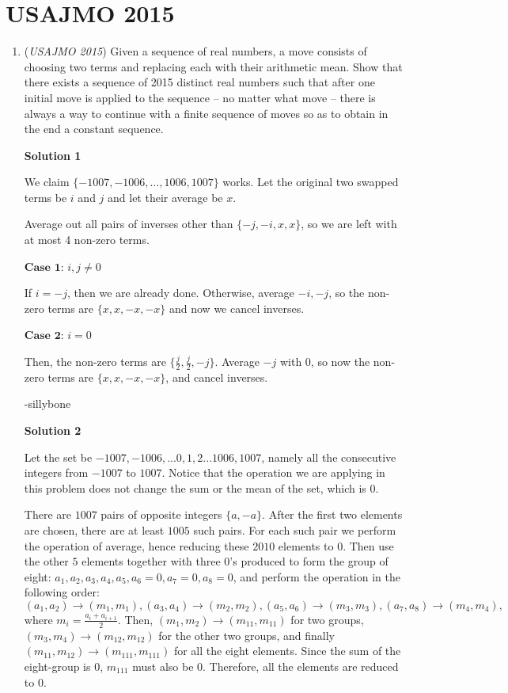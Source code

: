 \section{USAJMO 2015}
        \begin{enumerate}
        	\item (\textit{USAJMO 2015}) Given a sequence of real numbers, a move consists of choosing two terms and replacing each with their arithmetic mean. Show that there exists a sequence of 2015 distinct real numbers such that after one initial move is applied to the sequence -- no matter what move -- there is always a way to continue with a finite sequence of moves so as to obtain in the end a constant sequence.


 



\textbf{Solution 1}

We claim $\{-1007, -1006, \dots, 1006, 1007\}$ works. Let the original two swapped terms be $i$ and $j$ and let their average be $x$. 

 Average out all pairs of inverses other than $\{-j, -i, x, x\}$, so we are left with at most 4 non-zero terms. 

 $\textbf{Case 1: } i, j\neq 0$

 If $i = -j$, then we are already done. Otherwise, average $-i, -j$, so the non-zero terms are $\{x, x, -x, -x\}$ and now we cancel inverses.

 $\textbf{Case 2: } i=0$

 Then, the non-zero terms are $\{\frac{j}{2}, \frac{j}{2}, -j\}$. Average $-j$ with 0, so now the non-zero terms are $\{x, x, -x, -x\}$, and cancel inverses. 

 -sillybone

 



\textbf{Solution 2}

Let the set be ${-1007, -1006, ...0,1,2...1006, 1007}$, namely all the consecutive integers from $-1007$ to $1007$.  Notice that the operation we are applying in this problem does not change the sum or the mean of the set, which is $0$.  

 There are $1007$ pairs of opposite integers $\{a,-a\}$. After the first two elements are chosen, there are at least $1005$ such pairs. For each such pair we perform the operation of average, hence reducing these $2010$ elements to $0$. Then use the other $5$ elements together with three $0$'s produced to form the group of eight: ${a_1,a_2,a_3,a_4,a_5,a_6=0,a_7=0,a_8=0}$, and perform the operation in the following order: 
 \[(a_1,a_2)\to(m_1,m_1), (a_3,a_4)\to(m_2,m_2), (a_5,a_6)\to(m_3,m_3), (a_7,a_8)\to(m_4,m_4),\] where $m_i=\frac{a_i+a_{i+1}}{2}$. Then, $(m_1,m_2)\to(m_{11}, m_{11})$ for two groups, $(m_3,m_4)\to(m_{12}, m_{12})$ for the other two groups, and finally $(m_{11},m_{12})\to(m_{111}, m_{111})$ for all the eight elements. Since the sum of the eight-group is $0$, $m_{111}$ must also be $0$. Therefore, all the elements are reduced to $0$.


\end{enumerate}
